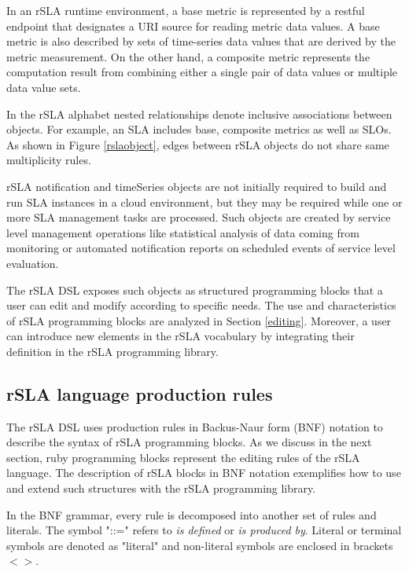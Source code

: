In an rSLA runtime environment, a base metric is represented by a restful endpoint that designates a URI source for reading metric data values. A base metric is also described by sets of time-series data values that are derived by the metric measurement. On the other hand, a composite metric represents the computation result from combining either a single pair of data values or multiple data value sets. 

In the rSLA alphabet nested relationships denote inclusive associations between objects. For example, an SLA includes base, composite metrics as well as SLOs. As shown in Figure \ref{rslaobject}, edges between  rSLA objects do not share same multiplicity rules. 

rSLA notification and timeSeries objects are not initially required to build and run SLA instances in a cloud environment, but they may be required while one or more SLA management tasks are processed. Such objects are created by service level management operations like statistical analysis of data coming from monitoring or automated notification reports on scheduled events of service level evaluation. 

The rSLA DSL exposes such objects as structured programming blocks that a user can edit and modify according to specific needs. The use and characteristics of rSLA programming blocks are analyzed in Section \ref{editing}. Moreover, a user can introduce new elements in the rSLA vocabulary by integrating their definition in the rSLA programming library. 

\subsection{rSLA language production rules}

The rSLA DSL uses production rules in Backus-Naur form (BNF) notation to describe the syntax of rSLA programming blocks. As we discuss in the next section, ruby programming blocks represent the editing rules of the rSLA language. The description of rSLA blocks in BNF notation exemplifies how to use and extend such structures with the rSLA programming library.

In the BNF grammar, every rule is decomposed into another set of rules and literals. The symbol "::=" refers to \textit{is defined} or \textit{is produced by}. Literal or terminal symbols are denoted as "literal" and non-literal symbols are enclosed in brackets $<>$.

